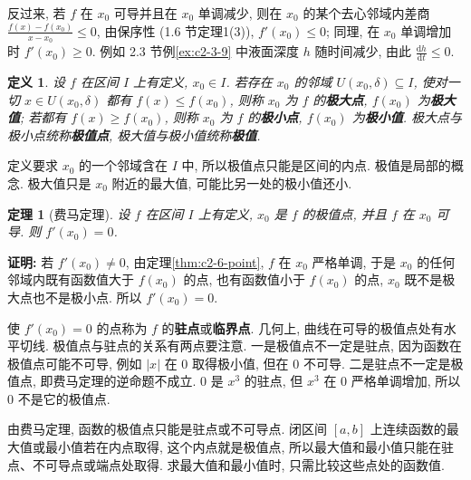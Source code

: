 \documentclass[UTF8,openany]{ctexbook}
\theoremstyle{chinesetextbook}
\newtheorem{definition}{定义}[section]
\newtheorem{theorem}{定理}[section]
\newenvironment{cnproof}{\par\indent\textbf{证明:} \ignorespaces}{\par}
\newcommand{\dd}{\mathrm d}
\begin{document}
反过来, 若 $f$ 在 $x_0$ 可导并且在 $x_0$ 单调减少, 则在 $x_0$ 的某个去心邻域内差商 $\displaystyle\frac{f(x)-f(x_0)}{x-x_0}\le0$, 由保序性 (1.6 节定理1(3)), $f'(x_0)\le0$; 同理, 在 $x_0$ 单调增加时 $f'(x_0)\ge0$. 例如 2.3 节例\ref{ex:c2-3-9} 中液面深度 $h$ 随时间减少, 由此 $\displaystyle\frac{\dd h}{\dd t}\le0$.
\begin{definition}
设 $f$ 在区间 $I$ 上有定义, $x_0\in I$. 若存在 $x_0$ 的邻域 $U(x_0,\delta)\subseteq I$, 使对一切 $x\in U(x_0,\delta)$ 都有 $f(x)\le f(x_0)$, 则称 $x_0$ 为 $f$ 的\textbf{极大点}, $f(x_0)$ 为\textbf{极大值}; 若都有 $f(x)\ge f(x_0)$, 则称 $x_0$ 为 $f$ 的\textbf{极小点}, $f(x_0)$ 为\textbf{极小值}. 极大点与极小点统称\textbf{极值点}, 极大值与极小值统称\textbf{极值}.
\end{definition}
定义要求 $x_0$ 的一个邻域含在 $I$ 中, 所以极值点只能是区间的内点. 极值是局部的概念. 极大值只是 $x_0$ 附近的最大值, 可能比另一处的极小值还小.
\begin{theorem}[费马定理]\label{thm:c2-6-fermat}
设 $f$ 在区间 $I$ 上有定义, $x_0$ 是 $f$ 的极值点, 并且 $f$ 在 $x_0$ 可导. 则 $f'(x_0)=0$.
\end{theorem}
\begin{cnproof}
若 $f'(x_0)\ne0$, 由定理\ref{thm:c2-6-point}, $f$ 在 $x_0$ 严格单调, 于是 $x_0$ 的任何邻域内既有函数值大于 $f(x_0)$ 的点, 也有函数值小于 $f(x_0)$ 的点, $x_0$ 既不是极大点也不是极小点. 所以 $f'(x_0)=0$.
\end{cnproof}
使 $f'(x_0)=0$ 的点称为 $f$ 的\textbf{驻点}或\textbf{临界点}. 几何上, 曲线在可导的极值点处有水平切线. 极值点与驻点的关系有两点要注意. 一是极值点不一定是驻点, 因为函数在极值点可能不可导, 例如 $|x|$ 在 $0$ 取得极小值, 但在 $0$ 不可导. 二是驻点不一定是极值点, 即费马定理的逆命题不成立. $0$ 是 $x^3$ 的驻点, 但 $x^3$ 在 $0$ 严格单调增加, 所以 $0$ 不是它的极值点.

由费马定理, 函数的极值点只能是驻点或不可导点. 闭区间 $[a,b]$ 上连续函数的最大值或最小值若在内点取得, 这个内点就是极值点, 所以最大值和最小值只能在驻点、不可导点或端点处取得. 求最大值和最小值时, 只需比较这些点处的函数值.
\end{document}

